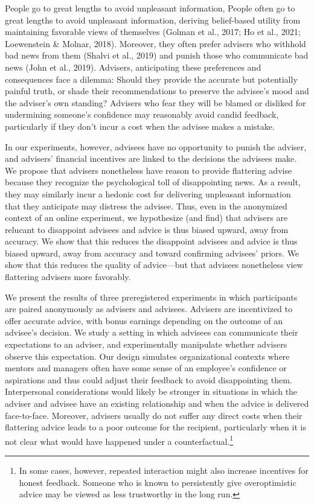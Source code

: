 \documentclass[
  man,
  floatsintext,
  longtable,
  nolmodern,
  notxfonts,
  notimes,
  colorlinks=true,linkcolor=blue,citecolor=blue,urlcolor=blue]{apa7}
\begin{document}
People go to great lengths to avoid unpleasant information, People often
go to great lengths to avoid unpleasant information, deriving
belief-based utility from maintaining favorable views of themselves
(Golman et al., 2017; Ho et al., 2021; Loewenstein \& Molnar, 2018).
Moreover, they often prefer advisers who withhold bad news from them
(Shalvi et al., 2019) and punish those who communicate bad news (John et
al., 2019). Advisers, anticipating these preferences and consequences
face a dilemma: Should they provide the accurate but potentially painful
truth, or shade their recommendations to preserve the advisee's mood and
the adviser's own standing? Advisers who fear they will be blamed or
disliked for undermining someone's confidence may reasonably avoid
candid feedback, particularly if they don't incur a cost when the
advisee makes a mistake.

In our experiments, however, advisees have no opportunity to punish the
adviser, and advisers' financial incentives are linked to the decisions
the advisees make. We propose that advisers nonetheless have reason to
provide flattering advise because they recognize the psychological toll
of disappointing news. As a result, they may similarly incur a hedonic
cost for delivering unpleasant information that they anticipate may
distress the advisee. Thus, even in the anonymized context of an online
experiment, we hypothesize (and find) that advisers are relucant to
disappoint advisees and advice is thus biased upward, away from
accuracy. We show that this reduces the disappoint advisees and advice
is thus biased upward, away from accuracy and toward confirming
advisees' priors. We show that this reduces the quality of advice---but
that advisees nonetheless view flattering advisers more favorably.

We present the results of three preregistered experiments in which
participants are paired anonymously as advisers and advisees. Advisers
are incentivized to offer accurate advice, with bonus earnings depending
on the outcome of an advisee's decision. We study a setting in which
advisees can communicate their expectations to an adviser, and
experimentally manipulate whether advisers observe this expectation. Our
design simulates organizational contexts where mentors and managers
often have some sense of an employee's confidence or aspirations and
thus could adjust their feedback to avoid disappointing them.
Interpersonal considerations would likely be stronger in situations in
which the adviser and advisee have an existing relationship and when the
advice is delivered face-to-face. Moreover, advisers usually do not
suffer any direct costs when their flattering advice leads to a poor
outcome for the recipient, particularly when it is not clear what would
have happened under a counterfactual.\footnote{In some cases, however,
  repeated interaction might also increase incentives for honest
  feedback. Someone who is known to persistently give overoptimistic
  advice may be viewed as less trustworthy in the long run.}
\end{document}
